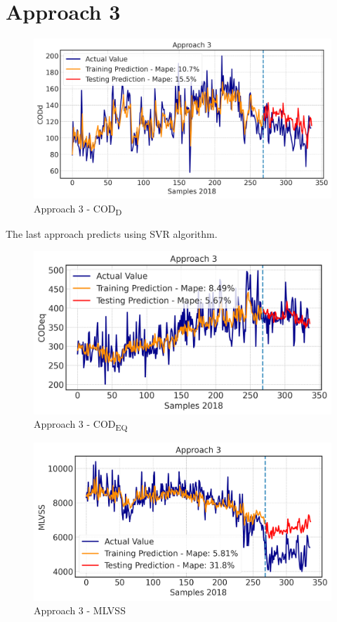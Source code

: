 \section{Approach 3}

\begin{figure}[h!]
\centering
\includegraphics[width=\linewidth]{figures/Ch5/CODd-3.png}
\caption{Approach 3 - COD\textsubscript{D}}
\label{f:App3-codd}
\end{figure}

The last approach predicts using \ac{SVR} algorithm.

\begin{figure}[h!]
\centering
\includegraphics[width=\linewidth]{figures/Ch5/CODeq-3.png}
\caption{Approach 3 - COD\textsubscript{EQ}}
\label{f:App3-codeq}
\end{figure}

\begin{figure}[h!]
\centering
\includegraphics[width=\linewidth]{figures/Ch5/MVLSS-approach3.png}
\caption{Approach 3 - MLVSS}
\label{f:App3-MLVSS}
\end{figure}

